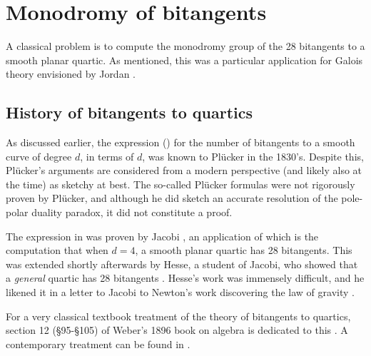 \documentclass[11pt]{amsart}
\begin{document}
\section{Monodromy of bitangents}

A classical problem is to compute the monodromy group of the 28 bitangents to a smooth planar quartic. As mentioned, this was a particular application for Galois theory envisioned by Jordan \cite[III.VI]{Jordan}.

\subsection{History of bitangents to quartics}

As discussed earlier, the expression () for the number of bitangents to a smooth curve of degree $d$, in terms of $d$, was known to Pl\"{u}cker in the 1830's. Despite this, Pl\"{u}cker's arguments are considered from a modern perspective (and likely also at the time) as sketchy at best. The so-called Pl\"{u}cker formulas were not rigorously proven by Pl\"{u}cker, and although he did sketch an accurate resolution of the pole-polar duality paradox, it did not constitute a proof.

The expression in  was proven by Jacobi \cite{Jacobi1850}, an application of which is the computation that when $d=4$, a smooth planar quartic has 28 bitangents. This was extended shortly afterwards by Hesse, a student of Jacobi, who showed that a \textit{general} quartic has 28 bitangents \cite{Hesse1855}. Hesse's work was immensely difficult, and he likened it in a letter to Jacobi to Newton's work discovering the law of gravity \cite[p.~165]{Gray-worlds}.

For a very classical textbook treatment of the theory of bitangents to quartics, section 12 (\S95-\S105) of Weber's 1896 book on algebra is dedicated to this \cite[\S95-\S105]{Weber1896}. A contemporary treatment can be found in \cite[\S6.1]{Dolgachev}.
\end{document}
